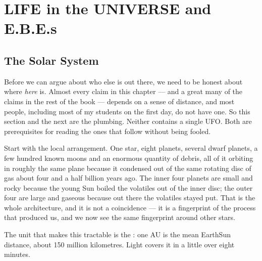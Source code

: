 \chapter{LIFE in the UNIVERSE and E.B.E.s}\label{ch:life}


\section{The Solar System}\label{sec:solarsystem}

Before we can argue about who else is out there, we need to be honest about where \emph{here}
is. Almost every claim in this chapter --- and a great many of the claims in the rest of the
book --- depends on a sense of distance, and most people, including most of my students on the
first day, do not have one. So this section and the next are the plumbing. Neither contains a
single UFO. Both are prerequisites for reading the ones that follow without being fooled.

Start with the local arrangement. One star, eight planets, several dwarf planets, a few
hundred known moons and an enormous quantity of debris, all of it orbiting in roughly the same
plane because it condensed out of the same rotating disc of gas about four and a half billion
years ago. The inner four planets are small and rocky because the young Sun boiled the
volatiles out of the inner disc; the outer four are large and gaseous because out there the
volatiles stayed put. That is the whole architecture, and it is not a coincidence --- it is a
fingerprint of the process that produced us, and we now see the same fingerprint around other
stars.

The unit that makes this tractable is the : one AU is the mean
Earth\ndash{}Sun distance, about 150 million kilometres. Light covers it in a little over
eight minutes.

